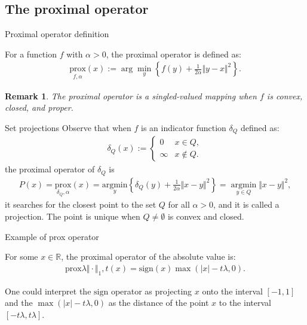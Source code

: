 \documentclass[11pt]{beamer}
\DeclareMathOperator {\argmin}{argmin}
\newtheorem{remark}{Remark}
\begin{document}
    \subsection{The proximal operator}
        \begin{frame}{Proximal operator definition}
            \begin{definition}
                For a function $f$ with $\alpha > 0$, the proximal operator is defined as: 
                \begin{align*}
                    \underset{{f, \alpha}}{\text{prox}}(x) := 
                    \arg\min_{y}\left\lbrace
                        f(y) + \frac{1}{2\alpha} \Vert y - x\Vert^2
                    \right\rbrace. 
                \end{align*}
            \end{definition}  
            \begin{remark}
                The proximal operator is a singled-valued mapping when $f$ is convex, closed, and proper. 
            \end{remark}
        \end{frame}
        \begin{frame}{Set projections}
            Observe that when $f$ is an indicator function $\delta_Q$ defined as: 
            \begin{align*}
                \delta_Q(x) := 
                \begin{cases}
                    0 & x \in Q,
                    \\
                    \infty  & x \not \in Q.
                \end{cases}
            \end{align*}
            the proximal operator of $\delta_Q$ is
            \begin{align*}
               P(x) = \underset{{\delta_Q, \alpha}}{\text{prox}}(x) = \underset{y}{\text{argmin}}
               \left\lbrace
                    \delta_Q(y) + \frac{1}{2\alpha}\Vert x - y\Vert^2
               \right\rbrace = \underset{y\in Q}{\argmin}\Vert x - y\Vert^2,
            \end{align*}
            it searches for the closest point to the set $Q$ for all $\alpha > 0$, and it is called a projection. The point is unique when $Q\neq \emptyset$ is convex and closed.
        \end{frame}
        \begin{frame}{Example of prox operator}
            \begin{definition}
                For some $x \in \mathbb R$, the proximal operator of the absolute value is:
                \begin{align*}
                   \text{prox}{\lambda \Vert\cdot \Vert_1, t}(x) = \text{sign}(x)\max(|x| - t\lambda , 0). 
                \end{align*}
            \end{definition}
            One could interpret the $\text{sign}$ operator as projecting $x$ onto the interval $[-1, 1]$ and the $\max(|x| - t\lambda , 0)$ as the distance of the point $x$ to the interval $[-t\lambda, t\lambda]$. 
        \end{frame}
\end{document}
